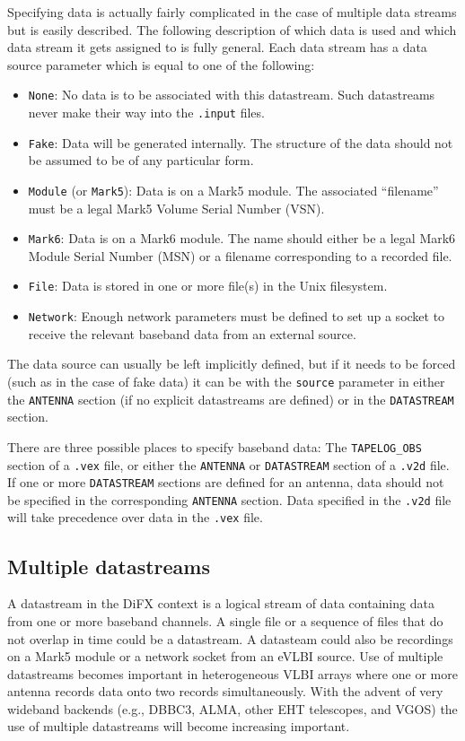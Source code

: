 \documentclass[12pt]{article}
\begin{document}
Specifying data is actually fairly complicated in the case of multiple data streams but is easily described.
The following description of which data is used and which data stream it gets assigned to is fully general.
Each data stream has a data source parameter which is equal to one of the following:
\begin{itemize}
\item {\tt None}: No data is to be associated with this datastream.  Such datastreams never make their way into the {\tt .input} files.
\item {\tt Fake}: Data will be generated internally.  The structure of the data should not be assumed to be of any particular form.
\item {\tt Module} (or {\tt Mark5}): Data is on a Mark5 module.  The associated ``filename'' must be a legal Mark5 Volume Serial Number (VSN).
\item {\tt Mark6}: Data is on a Mark6 module.  The name should either be a legal Mark6 Module Serial Number (MSN) or a filename corresponding to a recorded file.
\item {\tt File}: Data is stored in one or more file(s) in the Unix filesystem.
\item {\tt Network}: Enough network parameters must be defined to set up a socket to receive the relevant baseband data from an external source.
\end{itemize}
The data source can usually be left implicitly defined, but if it needs to be forced (such as in the case of fake data) it can be with the {\tt source} parameter in either the {\tt ANTENNA} section (if no explicit datastreams are defined) or in the {\tt DATASTREAM} section.

There are three possible places to specify baseband data: The {\tt TAPELOG\_OBS} section of a {\tt .vex} file, or either the {\tt ANTENNA} or {\tt DATASTREAM} section of a {\tt .v2d} file.
If one or more {\tt DATASTREAM} sections are defined for an antenna, data should not be specified in the corresponding {\tt ANTENNA} section.  
Data specified in the {\tt .v2d} file will take precedence over data in the {\tt .vex} file.


\subsection{Multiple datastreams} \label{sec:mds}

A datastream in the DiFX context is a logical stream of data containing data from one or more baseband channels.
A single file or a sequence of files that do not overlap in time could be a datastream.  A datasteam could also be recordings on a Mark5 module or a network socket from an eVLBI source.
Use of multiple datastreams becomes important in heterogeneous VLBI arrays where one or more antenna records data onto two records simultaneously.
With the advent of very wideband backends (e.g., DBBC3, ALMA, other EHT telescopes, and VGOS) the use of multiple datastreams will become increasing important.
\end{document}
